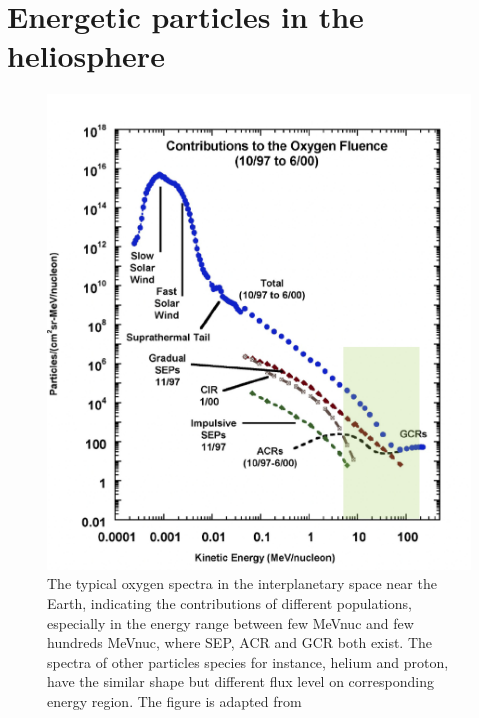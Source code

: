 \section{Energetic particles in the heliosphere}
\label{sec:particles_heliosphere}

\begin{figure}
	\centering
	\includegraphics[width = \textwidth]{images/heliospheric_particle_spectra_color.png}
	\caption[Energy spectra of oxygen ions in the near Earth space]{The typical oxygen spectra in the interplanetary space near the Earth, indicating the contributions of different populations, especially in the energy range between few MeV\/nuc and few hundreds MeV\/nuc, where \acs{SEP}, \acs{ACR} and \acs{GCR} both exist. The spectra of other particles species for instance, helium and proton, have the similar shape but different flux level on corresponding energy region. The figure is adapted from \cite{Mewaldt-2001}}
	\label{Fig:Oxygen_spectra_heliosphere}
\end{figure}

